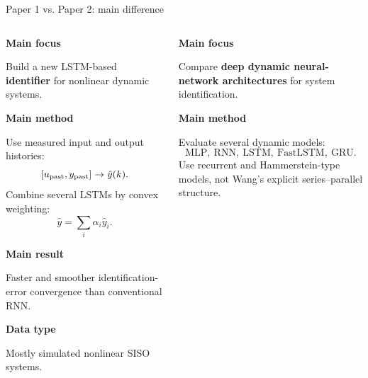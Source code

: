 \documentclass[aspectratio=169,10pt]{beamer}
\newcommand{\kw}[1]{\textcolor{Accent}{\textbf{#1}}}
\begin{document}
\begin{frame}{Paper 1 vs. Paper 2: main difference}
\scriptsize
\setlength{\abovedisplayskip}{3pt}
\setlength{\belowdisplayskip}{3pt}

\begin{columns}[T,onlytextwidth]

\begin{column}{0.485\textwidth}
\begin{tcolorbox}[
enhanced,
colback=LightGray,
colframe=DeepBlue,
colbacktitle=DeepBlue,
coltitle=white,
title=\textbf{Paper 1: Wang (2017)},
fonttitle=\small\bfseries,
boxrule=0.8pt,
arc=2mm,
left=2mm,right=2mm,top=1.5mm,bottom=1.5mm,
height=0.58\textheight
]
\textbf{Main focus}\par
Build a new LSTM-based \kw{identifier} for nonlinear dynamic systems.

\vspace{0.10cm}
\textbf{Main method}\par
Use measured input and output histories:
\[
[u_{\rm past},y_{\rm past}]\rightarrow\hat y(k).
\]
Combine several LSTMs by convex weighting:
\[
\hat y=\sum_i \alpha_i\hat y_i.
\]

\vspace{0.08cm}
\textbf{Main result}\par
Faster and smoother identification-error convergence than conventional RNN.

\vspace{0.08cm}
\textbf{Data type}\par
Mostly simulated nonlinear SISO systems.
\end{tcolorbox}
\end{column}

\begin{column}{0.485\textwidth}
\begin{tcolorbox}[
enhanced,
colback=LightGray,
colframe=SoftBlue,
colbacktitle=SoftBlue,
coltitle=white,
title=\textbf{Paper 2: Ogunmolu/Gans (2016)},
fonttitle=\small\bfseries,
boxrule=0.8pt,
arc=2mm,
left=2mm,right=2mm,top=1.5mm,bottom=1.5mm,
height=0.58\textheight
]
\textbf{Main focus}\par
Compare \kw{deep dynamic neural-network architectures} for system identification.

\vspace{0.10cm}
\textbf{Main method}\par
Evaluate several dynamic models:
\[
\text{MLP},\ \text{RNN},\ \text{LSTM},\ \text{FastLSTM},\ \text{GRU}.
\]
Use recurrent and Hammerstein-type models, not Wang's explicit series--parallel structure.


\end{tcolorbox}
\end{column}
\end{columns}
\end{frame}
\end{document}
